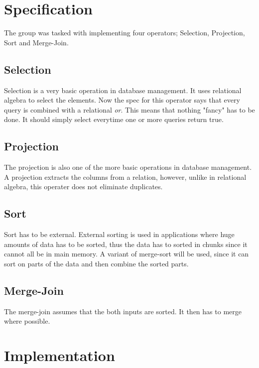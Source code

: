 \documentclass[a4paper,10pt,titlepage]{report}
\begin{document}
\section{Specification}
The group was tasked with implementing four operators; Selection, Projection, Sort and Merge-Join.

\subsection{Selection}
Selection is a very basic operation in database management. It uses relational algebra to select the elements. Now the spec for this operator says that every query is combined with a relational \textit{or}. This means that nothing "fancy" has to be done. It should simply select everytime one or more queries return true.
\subsection{Projection}
The projection is also one of the more basic operations in database management. A projection extracts the columns from a relation, however, unlike in relational algebra, this operater does not eliminate duplicates.
\subsection{Sort}
Sort has to be external. External sorting is used in applications where huge amounts of data has to be sorted, thus the data has to sorted in chunks since it cannot all be in main memory. A variant of merge-sort will be used, since it can sort on parts of the data and then combine the sorted parts.
\subsection{Merge-Join}
The merge-join assumes that the both inputs are sorted. It then has to merge where possible.

%

\section{Implementation}
\end{document}
